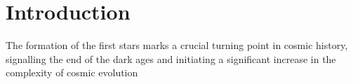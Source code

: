 \section{Introduction}
\label{intro}

The formation of the first stars marks a crucial turning point in cosmic history, signalling the end of the dark ages and initiating a significant increase in the complexity of cosmic evolution 

